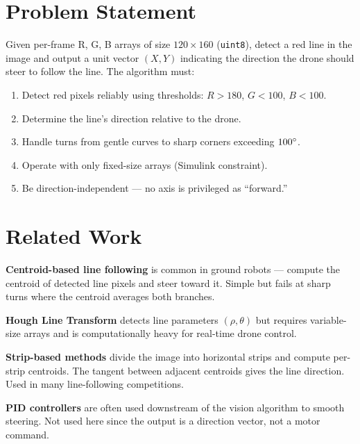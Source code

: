 \documentclass[conference, twocolumn]{IEEEtran}
\begin{document}
\section{Problem Statement}

Given per-frame R, G, B arrays of size $120\times160$ (\texttt{uint8}), detect a red line in the image and output a unit vector $(X, Y)$ indicating the direction the drone should steer to follow the line. The algorithm must:

\begin{enumerate}
    \item Detect red pixels reliably using thresholds: $R > 180$, $G < 100$, $B < 100$.
    \item Determine the line's direction relative to the drone.
    \item Handle turns from gentle curves to sharp corners exceeding $100\degree$.
    \item Operate with only fixed-size arrays (Simulink constraint).
    \item Be direction-independent --- no axis is privileged as ``forward.''
\end{enumerate}

\section{Related Work}

\textbf{Centroid-based line following} is common in ground robots --- compute the centroid of detected line pixels and steer toward it. Simple but fails at sharp turns where the centroid averages both branches.

\textbf{Hough Line Transform} detects line parameters $(\rho, \theta)$ but requires variable-size arrays and is computationally heavy for real-time drone control.

\textbf{Strip-based methods} divide the image into horizontal strips and compute per-strip centroids. The tangent between adjacent centroids gives the line direction. Used in many line-following competitions.

\textbf{PID controllers} are often used downstream of the vision algorithm to smooth steering. Not used here since the output is a direction vector, not a motor command.
\end{document}
